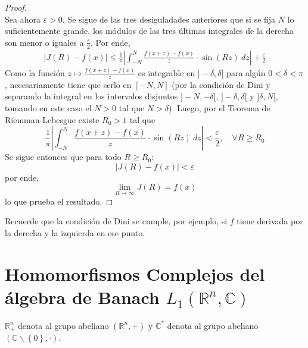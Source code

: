 \documentclass[12pt]{report}
\newcounter{it}
\theoremstyle{largebreak}
\renewcommand{\leq}{\ensuremath{\leqslant}}
\renewcommand{\geq}{\ensuremath{\geqslant}}
\newcommand\abs[1]{\ensuremath{\left|#1\right|}}
\begin{document}
\begin{proof}
\begin{equation*}
        \end{equation*}
        Sea ahora $\varepsilon>0$. Se sigue de las tres desiguladades anteriores que si se fija $N$ lo suficientemente grande, los módulos de las tres últimas integrales de la derecha son menor o iguales a $\frac{\varepsilon}{2}$. Por ende,
        \begin{equation*}
            \begin{split}
                \abs{J(R)-f(x)}\leq\frac{1}{\pi}\abs{\int_{-N}^{N}\frac{f(x+z)-f(x)}{z}\cdot\sin(Rz)\:dz}+\frac{\varepsilon}{2}
            \end{split}
        \end{equation*}
        Como la función $z\mapsto\frac{f(x+z)-f(x)}{z}$ es integrable en $]-\delta,\delta[$ para algún $0<\delta<\pi$, necesariamente tiene que serlo en $[-N,N]$ (por la condición de Dini y separando la integral en los intervalos disjuntos $]-N,-\delta[$, $]-\delta,\delta[$ y $]\delta, N[$, tomando en este caso el $N>0$ tal que $N>\delta$). Luego, por el Teorema de Riemman-Lebesgue existe $R_0>1$ tal que
        \begin{equation*}
            \frac{1}{\pi}\abs{\int_{-N}^{N}\frac{f(x+z)-f(x)}{z}\cdot\sin(Rz) \:dz}<\frac{\varepsilon}{2},\quad\forall R\geq R_0
        \end{equation*} 
        Se sigue entonces que para todo $R\geq R_0$:
        \begin{equation*}
            \abs{J(R)-f(x)}<\varepsilon
        \end{equation*}
        por ende,
        \begin{equation*}
            \lim_{ R\rightarrow\infty}J(R)=f(x)
        \end{equation*}
        lo que prueba el resultado.
    \end{proof}

    \begin{obs}
        Recuerde que la condición de Dini se cumple, por ejemplo, si $f$ tiene derivada por la derecha y la izquierda en ese punto.
    \end{obs}

    \section{Homomorfismos Complejos del álgebra de Banach $L_1(\mathbb{R}^n,\mathbb{C} )$}

    \begin{obs}
        $\mathbb{R}^n_+$ denota al grupo abeliano $(\mathbb{R}^n,+)$ y $\mathbb{C}^*$ denota al grupo abeliano $(\mathbb{C}\backslash\left\{0\right\},\cdot)$.
    \end{obs}
\end{document}
